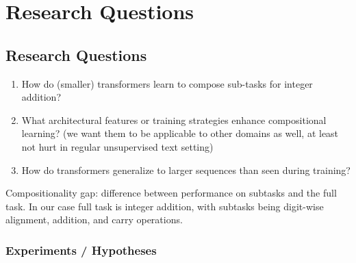 \chapter{Research Questions}\label{research_questions}


\section*{Research Questions}

\begin{enumerate}
    \item How do (smaller) transformers learn to compose sub-tasks for integer addition?
    \item What architectural features or training strategies enhance compositional learning? (we want them to be applicable to other domains as well, at least not hurt in regular unsupervised text setting)
    \item How do transformers generalize to larger sequences than seen during training?
\end{enumerate}

Compositionality gap: difference between performance on subtasks and the full task. In our case full task is integer addition, with subtasks being digit-wise alignment, addition, and carry operations.

\subsection*{Experiments / Hypotheses}

